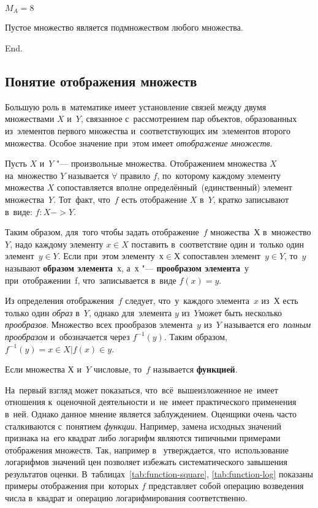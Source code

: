 \documentclass[]{scrartcl}
\begin{document}
{{\begin{Thexmpl}
	$M_A = 8$
\end{Thexmpl}

\begin{theorem}
	Пустое множество является подмножеством любого множества.
\end{theorem}
End.\cite{Studopedia:mnozhestvo}
\subsection{Понятие отображения множеств}
Большую роль в~математике имеет установление связей между двумя множествами $X$ и~$Y$, связанное с~рассмотрением пар объектов, образованных из~элементов первого множества и~соответствующих им~элементов второго множества. Особое значение при~этом имеет \emph{отображение множеств}.

Пусть $X$ и~$Y$ "--- произвольные множества. Отображением множества $X$ на~множество $Y$ называется $\forall$ правило $f$, по~которому каждому элементу множества $X$ сопоставляется вполне определённый~(единственный) элемент множества~$Y$. Тот~факт, что~$f$ есть отображение $X$ в~$Y$, кратко записывают в~виде: $f:X->Y$.

Таким образом, для~того чтобы задать отображение~$f$ множества~$Х$ в~множество $Y$, надо каждому элементу $x\in X$ поставить в~соответствие один и~только один элемент~$y \in Y$. Если при~этом элементу~$х \in Х$ сопоставлен элемент~$y \in Y$, то~$y$ называют \textbf{образом элемента}~$х$, а~$х$ "--- \textbf{прообразом элемента}~у при~отображении~f, что~записывается в~виде $f(x)=y$.

Из определения отображения~$f$ следует, что~у~каждого элемента~$x$ из~$Х$ есть только один \emph{образ} в~$Y$, однако для~элемента $y$ из~$Y$может быть несколько \emph{прообразов}. Множество всех прообразов элемента~$y$ из~$Y$ называется его~\emph{полным прообразом} и~обозначается через $f^{-1}(y)$. Таким образом, $f^{-1}(y)={x \in X | f(x) \in y}$.

Если множества $Х$ и~$Y$ числовые, то~$f$ называется \textbf{функцией}.

На~первый взгляд может показаться, что~всё~вышеизложенное не~имеет отношения к~оценочной деятельности и~не~имеет практического применения в~ней. Однако данное мнение является заблуждением. Оценщики очень часто сталкиваются с~понятием \emph{функции}. Например, замена исходных значений признака на~его квадрат либо логарифм являются типичными примерами отображения множеств. Так, например в~\cite{Laskin:lognorm} утверждается, что~использование логарифмов значений цен позволяет избежать систематического завышения результатов оценки. В~таблицах~\ref{tab:function-square}, \ref{tab:function-log} показаны примеры отображения при~которых $f$ представляет собой операцию возведения числа в~квадрат и~операцию логарифмирования соответственно.

}}
\end{document}
